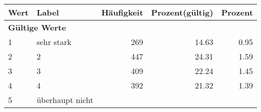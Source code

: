      \begin{longtable}{lXrrr}
     \toprule
     \textbf{Wert} & \textbf{Label} & \textbf{Häufigkeit} & \textbf{Prozent(gültig)} & \textbf{Prozent} \\
     \endhead
     \midrule
     \multicolumn{5}{l}{\textbf{Gültige Werte}}\\

     1 &
     \multicolumn{1}{X}{ sehr stark   } &


       \num{269} &
       \num[round-mode=places,round-precision=2]{14,63} &
         \num[round-mode=places,round-precision=2]{0,95} \\

     2 &
     \multicolumn{1}{X}{ 2   } &


       \num{447} &
       \num[round-mode=places,round-precision=2]{24,31} &
         \num[round-mode=places,round-precision=2]{1,59} \\

     3 &
     \multicolumn{1}{X}{ 3   } &


       \num{409} &
       \num[round-mode=places,round-precision=2]{22,24} &
         \num[round-mode=places,round-precision=2]{1,45} \\

     4 &
     \multicolumn{1}{X}{ 4   } &


       \num{392} &
       \num[round-mode=places,round-precision=2]{21,32} &
         \num[round-mode=places,round-precision=2]{1,39} \\

     5 &
     \multicolumn{1}{X}{ überhaupt nicht   } &



\end{longtable}
